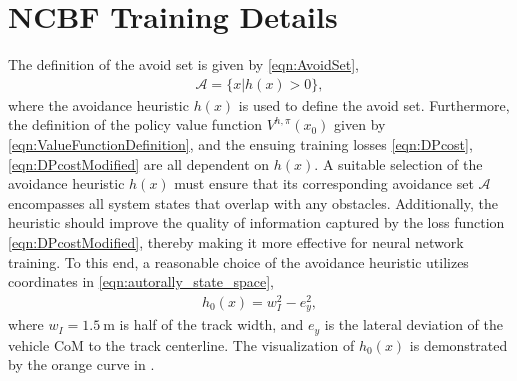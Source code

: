 \section{NCBF Training Details}

The definition of the avoid set is given by \eqref{eqn:AvoidSet}, 
\begin{align}
    \mathcal{A} = \{x|h(x) > 0 \}, \nonumber
\end{align}
where the avoidance heuristic $h(x)$ is used to define the avoid set. 
Furthermore, the definition of the policy value function $V^{h,\pi}(x_0)$ given by \eqref{eqn:ValueFunctionDefinition}, and the ensuing training losses \eqref{eqn:DPcost}, \eqref{eqn:DPcostModified} are all dependent on $h(x)$. 
A suitable selection of the avoidance heuristic $h(x)$ must ensure that its corresponding avoidance set $\mathcal{A}$ encompasses all system states that overlap with any obstacles.
Additionally, the heuristic should improve the quality of information captured by the loss function \eqref{eqn:DPcostModified}, thereby making it more effective for neural network training. 
To this end, a reasonable choice of the avoidance heuristic utilizes coordinates in \eqref{eqn:autorally_state_space},
\begin{align}
    h_0(x) = w_I^2 - e_y^2,
\end{align}
where $w_I = 1.5~\mathrm{m}$ is half of the track width, and $e_y$ is the lateral deviation of the vehicle CoM to the track centerline. The visualization of $h_0(x)$ is demonstrated by the orange curve in .

